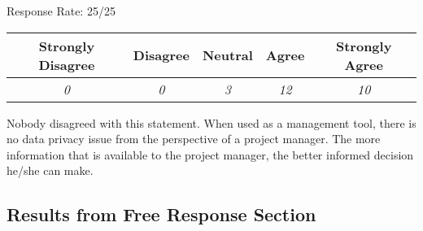 \begin{center}Response Rate: 25/25\end{center}
\begin{table}[h]
	\centering
		\begin{tabular}{|c|c|c|c|c|} 
			\hline
			\textbf{Strongly Disagree} & \textbf{Disagree} & \textbf{Neutral} & \textbf{Agree} & \textbf{Strongly Agree} \\
			\hline
			\textit{0} & \textit{0} & \textit{3} & \textit{12} &\textit{10} \\
			\hline
		\end{tabular}
	\label{table:InClassSurvey-Q7}
\end{table}

%

Nobody disagreed with this statement. When used as a management tool, there is no data privacy issue from the perspective of a project manager. The more information that is available to the project manager, the better informed decision he/she can make. 









\newpage
\subsection{Results from Free Response Section}

